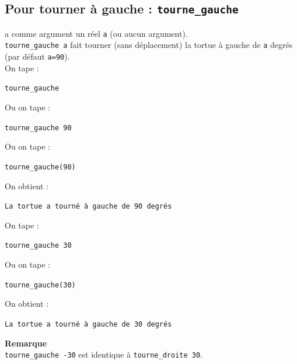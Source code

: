 \documentclass[a4paper,11pt]{book}
\begin{document}
\subsection{Pour tourner \`a gauche : {\tt tourne\_gauche}}
 a comme argument un r\'eel {\tt a} 
(ou aucun argument).\\
{\tt tourne\_gauche a} fait tourner (sans d\'eplacement) la tortue \`a gauche 
de {\tt a}  degr\'es (par d\'efaut {\tt a=90}).\\
On tape :
\begin{center}{\tt tourne\_gauche}\end{center}
Ou on tape :
\begin{center}{\tt tourne\_gauche 90}\end{center}
Ou on tape :
\begin{center}{\tt tourne\_gauche(90)}\end{center}
On obtient :
\begin{center}{\tt La tortue a tourn\'e \`a gauche de 90 degr\'es}\end{center}
On tape :
\begin{center}{\tt tourne\_gauche 30}\end{center}
Ou on tape :
\begin{center}{\tt tourne\_gauche(30)}\end{center}
On obtient :
\begin{center}{\tt La tortue a tourn\'e \`a gauche de 30 degr\'es}\end{center}
{\bf Remarque}\\
{\tt tourne\_gauche -30} est identique \`a {\tt tourne\_droite 30}.
\end{document}
